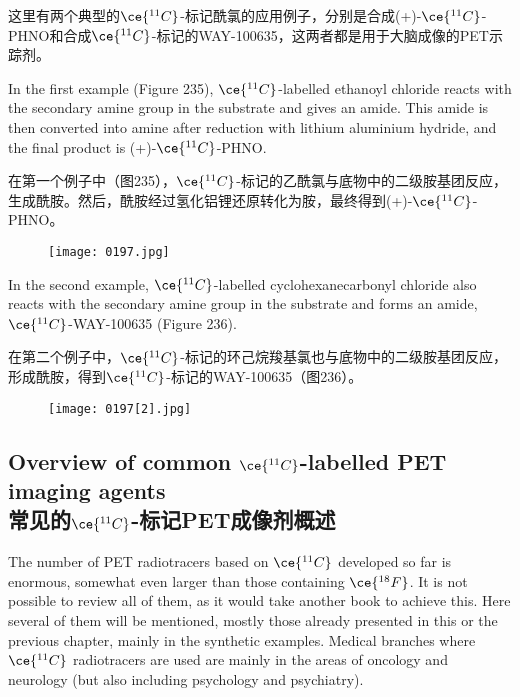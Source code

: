 \documentclass[dvipsnames, svgnames,a4paper,11pt]{article}
\begin{document}
这里有两个典型的\(\ce{^{11}C}\)-标记酰氯的应用例子，分别是合成(+)-\(\ce{^{11}C}\)-PHNO和合成\(\ce{^{11}C}\)-标记的WAY-100635，这两者都是用于大脑成像的PET示踪剂。  

In the first example (Figure 235), \(\ce{^{11}C}\)-labelled ethanoyl chloride reacts with the secondary amine group in the substrate and gives an amide. This amide is then converted into amine after reduction with lithium aluminium hydride, and the final product is (+)-\(\ce{^{11}C}\)-PHNO.  

在第一个例子中（图235），\(\ce{^{11}C}\)-标记的乙酰氯与底物中的二级胺基团反应，生成酰胺。然后，酰胺经过氢化铝锂还原转化为胺，最终得到(+)-\(\ce{^{11}C}\)-PHNO。  


\begin{figure}[h]
	\centering
    \texttt{[image: 0197.jpg]}  
     \label{fig235}
\end{figure}

In the second example, \(\ce{^{11}C}\)-labelled cyclohexanecarbonyl chloride also reacts with the secondary amine group in the substrate and forms an amide, \(\ce{^{11}C}\)-WAY-100635 (Figure 236).

在第二个例子中，\(\ce{^{11}C}\)-标记的环己烷羧基氯也与底物中的二级胺基团反应，形成酰胺，得到\(\ce{^{11}C}\)-标记的WAY-100635（图236）。

\begin{figure}[h]
	\centering
    \texttt{[image: 0197[2].jpg]}  
     \label{fig236}
\end{figure}

\subsection{Overview of common \(\ce{^{11}C}\)-labelled PET imaging agents \\常见的\(\ce{^{11}C}\)-标记PET成像剂概述}  
The number of PET radiotracers based on \(\ce{^{11}C}\) developed so far is enormous, somewhat even larger than those containing \(\ce{^{18}F}\). It is not possible to review all of them, as it would take another book to achieve this. Here several of them will be mentioned, mostly those already presented in this or the previous chapter, mainly in the synthetic examples. Medical branches where \(\ce{^{11}C}\) radiotracers are used are mainly in the areas of oncology and neurology (but also including psychology and psychiatry).
\end{document}
